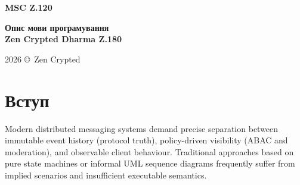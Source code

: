 \documentclass{article}
\newcommand\HUGE[1]{\fontsize{40}{40}\selectfont #1}
\begin{document}
\pagestyle{fancy}

\begin{titlepage}
  \AddToShipoutPictureBG*{\AtPageLowerLeft{\color{nato}\rule{\paperwidth}{\paperheight}}}
  \color{white}\thispagestyle{empty}\vspace*{4cm}\centering
  {\Huge  \textbf{MSC Z.120} \par} \vspace{2cm}
  {\HUGE  \textbf{Опис мови програмування \\
                     Zen Crypted Dharma Z.180} \par} \vspace{2.5cm}
  \vfill
  {\large 2026 \copyright\ Zen Crypted \par}
\end{titlepage}

\newpage

\tableofcontents

\vspace{3cm}

\begin{abstract}
The Zen Crypted Dharma DSL V.120 is a scenario-based executable specification language developed for the
Zen Crypted Buddha V.420 messaging protocol within the synrc/chat ecosystem. This paper presents a complete
formal description of the language and demonstrates its natural mapping onto the standardised Message
Sequence Chart (MSC) notation defined in ITU-T Recommendation Z.120. By preserving the canonical/exact
duality of the DSL while grounding it in a typed semantic kernel, the language enables rigorous verification
of cross-layer invariants between protocol state, read/replay semantics, moderation, and attribute-based
access control (ABAC). The adaptation preserves all behavioural guarantees of the original DSL while
making it directly compatible with formal methods, TTCN-3 test generation, and high-level MSC (HMSC) composition.
The resulting specification satisfies the strict requirements of international telecommunication standards review.
\end{abstract}

\newpage

\section{Вступ}
Modern distributed messaging systems demand precise separation between immutable event history (protocol truth),
policy-driven visibility (ABAC and moderation), and observable client behaviour. Traditional approaches based
on pure state machines or informal UML sequence diagrams frequently suffer from implied scenarios and
insufficient executable semantics.
\end{document}
